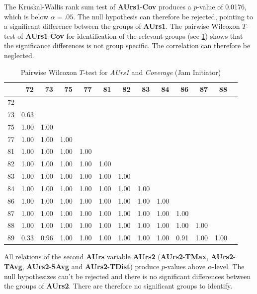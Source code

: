 The Kruskal-Wallis rank sum test of \textbf{AUrs1}-\textbf{Cov} produces a $p$-value of 0.0176, which is below $\alpha=.05$. The null hypothesis can therefore be rejected, pointing to a significant difference between the groups of \textbf{AUrs1}. The pairwise Wilcoxon $T$-test of \textbf{AUrs1}-\textbf{Cov} for identification of the relevant groups (see \cref{tbl:wilcoxon_baysis_initiator_AUrs1_Cov}) shows that the significance differences is not group specific. The correlation can therefore be neglected.
\begin{table}[ht]
	\small
	\centering
    \begin{tabular}{rrrrrrrrrrrrr}
        \toprule
           & 72 & 73 & 75 & 77 & 81 & 82 & 83 & 84 & 86 & 87 & 88 \\ 
        \midrule
        72 &  &  &  &  &  &  &  &  &  &  &  \\ 
        73 & 0.63 &  &  &  &  &  &  &  &  &  &  \\ 
        75 & 1.00 & 1.00 &  &  &  &  &  &  &  &  &  \\ 
        77 & 1.00 & 1.00 & 1.00 &  &  &  &  &  &  &  &  \\ 
        81 & 1.00 & 1.00 & 1.00 & 1.00 &  &  &  &  &  &  &  \\ 
        82 & 1.00 & 1.00 & 1.00 & 1.00 & 1.00 &  &  &  &  &  &  \\ 
        83 & 1.00 & 1.00 & 1.00 & 1.00 & 1.00 & 1.00 &  &  &  &  &  \\ 
        84 & 1.00 & 1.00 & 1.00 & 1.00 & 1.00 & 1.00 & 1.00 &  &  &  &  \\ 
        86 & 1.00 & 1.00 & 1.00 & 1.00 & 1.00 & 1.00 & 1.00 & 1.00 &  &  &  \\ 
        87 & 1.00 & 1.00 & 1.00 & 1.00 & 1.00 & 1.00 & 1.00 & 1.00 & 1.00 &  &  \\ 
        88 & 1.00 & 1.00 & 1.00 & 1.00 & 1.00 & 1.00 & 1.00 & 1.00 & 1.00 & 1.00 &  \\ 
        89 & 0.33 & 0.96 & 1.00 & 1.00 & 1.00 & 1.00 & 1.00 & 1.00 & 0.91 & 1.00 & 1.00 \\ 
        \bottomrule
    \end{tabular}
    \caption{Pairwise Wilcoxon $T$-test for \textit{AUrs1} and \textit{Coverage} (Jam Initiator)}
    \label{tbl:wilcoxon_baysis_initiator_AUrs1_Cov}
\end{table}

\medskip
All relations of the second \textbf{AUrs} variable \textbf{AUrs2} (\textbf{AUrs2}-\textbf{TMax}, \textbf{AUrs2}-\textbf{TAvg}, \textbf{AUrs2}-\textbf{SAvg} and \textbf{AUrs2}-\textbf{TDist}) produce $p$-values above $\alpha$-level. The null hypothesizes can't be rejected and there is no significant differences between the groups of \textbf{AUrs2}. There are therefore no significant groups to identify.

